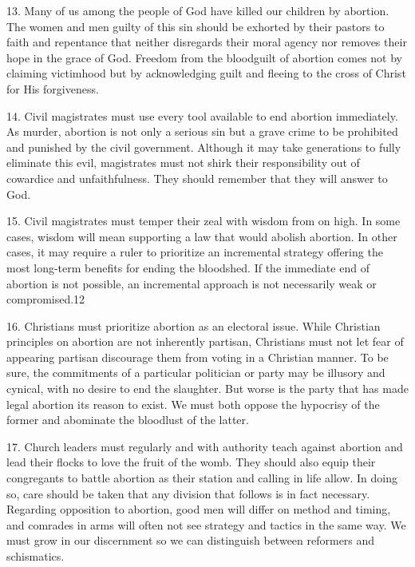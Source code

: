 \documentclass[
]{book}
\begin{document}
13. Many of us among the people of God have killed our children by abortion. The women and men guilty of this sin should be exhorted by their pastors to faith and repentance that neither disregards their moral agency nor removes their hope in the grace of God. Freedom from the bloodguilt of abortion comes not by claiming victimhood but by acknowledging guilt and fleeing to the cross of Christ for His forgiveness.

14. Civil magistrates must use every tool available to end abortion immediately. As murder, abortion is not only a serious sin but a grave crime to be prohibited and punished by the civil government. Although it may take generations to fully eliminate this evil, magistrates must not shirk their responsibility out of cowardice and unfaithfulness. They should remember that they will answer to God.

15. Civil magistrates must temper their zeal with wisdom from on high. In some cases, wisdom will mean supporting a law that would abolish abortion. In other cases, it may require a ruler to prioritize an incremental strategy offering the most long-term benefits for ending the bloodshed. If the immediate end of abortion is not possible, an incremental approach is not necessarily weak or compromised.12

16. Christians must prioritize abortion as an electoral issue. While Christian principles on abortion are not inherently partisan, Christians must not let fear of appearing partisan discourage them from voting in a Christian manner. To be sure, the commitments of a particular politician or party may be illusory and cynical, with no desire to end the slaughter. But worse is the party that has made legal abortion its reason to exist. We must both oppose the hypocrisy of the former and abominate the bloodlust of the latter.

17. Church leaders must regularly and with authority teach against abortion and lead their flocks to love the fruit of the womb. They should also equip their congregants to battle abortion as their station and calling in life allow. In doing so, care should be taken that any division that follows is in fact necessary. Regarding opposition to abortion, good men will differ on method and timing, and comrades in arms will often not see strategy and tactics in the same way. We must grow in our discernment so we can distinguish between reformers and schismatics.
\end{document}
